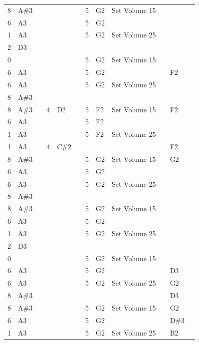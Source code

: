 \begin{figure}[H]
{\begin{adjustbox}{width=11cm,center}
\begin{tabular}{llllllllllll}
8 & A\#3 &   &   &   &   & 5 & G2 & Set Volume 15 &   &   &   \\
6 & A3 &   &   &   &   & 5 & G2 &   &   &   &   \\
1 & A3 &   &   &   &   & 5 & G2 & Set Volume 25 &   &   &   \\
2 & D3 &   &   &   &   &   &   &   &   &   &   \\
0 &   &   &   &   &   & 5 & G2 & Set Volume 15 &   &   &   \\
6 & A3 &   &   &   &   & 5 & G2 &   &   & F2 &   \\
6 & A3 &   &   &   &   & 5 & G2 & Set Volume 25 &   &   &   \\
8 & A\#3 &   &   &   &   &   &   &   &   &   &   \\
8 & A\#3 &   & 4 & D2 &   & 5 & F2 & Set Volume 15 &   & F2 &   \\
6 & A3 &   &   &   &   & 5 & F2 &   &   &   &   \\
1 & A3 &   &   &   &   & 5 & F2 & Set Volume 25 &   &   &   \\
1 & A3 &   & 4 & C\#2 &   &   &   &   &   & F2 &   \\
8 & A\#3 &   &   &   &   & 5 & G2 & Set Volume 15 &   & G2 &   \\
6 & A3 &   &   &   &   & 5 & G2 &   &   &   &   \\
6 & A3 &   &   &   &   & 5 & G2 & Set Volume 25 &   &   &   \\
8 & A\#3 &   &   &   &   &   &   &   &   &   &   \\
8 & A\#3 &   &   &   &   & 5 & G2 & Set Volume 15 &   &   &   \\
6 & A3 &   &   &   &   & 5 & G2 &   &   &   &   \\
1 & A3 &   &   &   &   & 5 & G2 & Set Volume 25 &   &   &   \\
2 & D3 &   &   &   &   &   &   &   &   &   &   \\
0 &   &   &   &   &   & 5 & G2 & Set Volume 15 &   &   &   \\
6 & A3 &   &   &   &   & 5 & G2 &   &   & D3 &   \\
6 & A3 &   &   &   &   & 5 & G2 & Set Volume 25 &   & G2 &   \\
8 & A\#3 &   &   &   &   &   &   &   &   & D3 &   \\
8 & A\#3 &   &   &   &   & 5 & G2 & Set Volume 15 &   & G2 &   \\
6 & A3 &   &   &   &   & 5 & G2 &   &   & D\#3 &   \\
1 & A3 &   &   &   &   & 5 & G2 & Set Volume 25 &   & B2 &   \\

\end{tabular}
\end{adjustbox}}
\end{figure}
